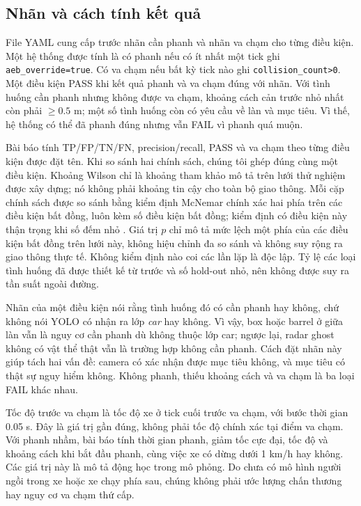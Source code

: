 \documentclass[conference]{IEEEtran}
\begin{document}
\subsection{Nhãn và cách tính kết quả}
File YAML cung cấp trước nhãn cần phanh và nhãn va chạm cho từng điều kiện.
Một hệ thống được tính là có phanh nếu có ít nhất một tick ghi
\texttt{aeb\_override=true}. Có va chạm nếu bất kỳ tick nào ghi
\texttt{collision\_count>0}. Một điều kiện PASS khi kết quả phanh và va chạm
đúng với nhãn. Với tình huống cần phanh nhưng không được va chạm, khoảng cách
cản trước nhỏ nhất còn phải $\geq0.5$ m; một số tình huống còn có yêu cầu về
làn và mục tiêu. Vì thế, hệ thống có thể đã phanh đúng nhưng vẫn FAIL vì phanh
quá muộn.

Bài báo tính TP/FP/TN/FN, precision/recall, PASS và va chạm theo từng điều
kiện được đặt tên. Khi so sánh hai chính sách, chúng tôi ghép đúng cùng một
điều kiện. Khoảng Wilson \cite{wilson1927} chỉ là khoảng tham khảo mô tả trên lưới thử nghiệm
được xây dựng; nó không phải khoảng tin cậy cho toàn bộ giao thông. Mỗi cặp
chính sách được so sánh bằng kiểm định McNemar chính xác hai phía
\cite{mcnemar1947} trên các điều kiện bất đồng, luôn kèm số điều kiện bất đồng;
kiểm định có điều kiện này thận trọng khi số đếm nhỏ \cite{fagerland2013mcnemar}.
Giá trị $p$ chỉ mô tả mức lệch một phía của các điều kiện bất đồng trên lưới
này, không hiệu chỉnh đa so sánh và không suy rộng ra giao thông thực tế. Không
kiểm định nào coi các lần lặp là độc lập. Tỷ lệ các
loại tình huống đã được thiết kế từ trước và số hold-out nhỏ, nên không được
suy ra tần suất ngoài đường.

Nhãn của một điều kiện nói rằng tình huống đó có cần phanh hay không, chứ
không nói YOLO có nhận ra lớp \emph{car} hay không. Vì vậy, box hoặc barrel ở
giữa làn vẫn là nguy cơ cần phanh dù không thuộc lớp car; ngược lại, radar
ghost không có vật thể thật vẫn là trường hợp không cần phanh. Cách đặt nhãn
này giúp tách hai vấn đề: camera có xác nhận được mục tiêu không, và mục tiêu
có thật sự nguy hiểm không. Không phanh, thiếu khoảng cách và va chạm là ba
loại FAIL khác nhau.

Tốc độ trước va chạm là tốc độ xe ở tick cuối trước va chạm, với bước thời
gian 0.05 s. Đây là giá trị gần đúng, không phải tốc độ chính xác tại điểm
va chạm. Với phanh nhầm, bài báo tính thời gian phanh, giảm tốc cực đại,
tốc độ và khoảng cách khi bắt đầu phanh, cùng việc xe có dừng dưới 1 km/h
hay không. Các giá trị này là mô tả động học trong mô phỏng. Do chưa có mô
hình người ngồi trong xe hoặc xe chạy phía sau, chúng không phải ước lượng
chấn thương hay nguy cơ va chạm thứ cấp.
\end{document}
